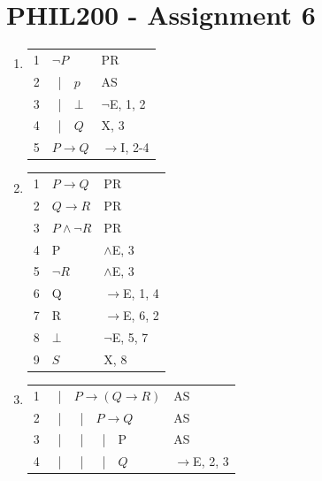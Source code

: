\documentclass{article}
\newcommand{\asbar}{\ |\ \ }
\begin{document}
\section*{PHIL200 - Assignment 6}

\begin{enumerate}
    \item \begin{tabular}{l|p{8cm}l}
              1 & $\neg P$      & PR            \\
              2 & \asbar $p$    & AS            \\
              3 & \asbar $\bot$ & $\neg$E, 1, 2 \\
              4 & \asbar $Q$    & X, 3          \\
              5 & $P \to Q$     & $\to$I, 2-4   \\
              \hline
          \end{tabular}
    \item \begin{tabular}{l|p{8cm}l}
              1 & $P \to Q$        & PR            \\
              2 & $Q \to R$        & PR            \\
              3 & $P \land \neg R$ & PR            \\
              4 & P                & $\land$E, 3   \\
              5 & $\neg R$         & $\land$E, 3   \\
              6 & Q                & $\to$E, 1, 4  \\
              7 & R                & $\to$E, 6, 2  \\
              8 & $\bot$           & $\neg$E, 5, 7 \\
              9 & $S$              & X, 8          \\
              \hline
          \end{tabular}
    \item \begin{tabular}{l|p{8cm}l}
              1 & \asbar $P \to (Q \to R)$                          & AS           \\
              2 & \asbar \asbar $P \to Q$                           & AS           \\
              3 & \asbar \asbar \asbar P                            & AS           \\
              4 & \asbar \asbar \asbar $Q$                          & $\to$E, 2, 3 \\

\end{tabular}
\end{enumerate}
\end{document}
